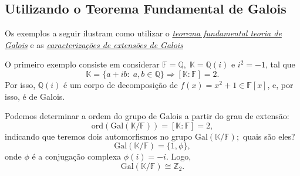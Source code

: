 \documentclass[../algebraIII_notes.tex]{subfiles}
\begin{document}
\subsection{Utilizando o Teorema Fundamental de Galois}
Os exemplos a seguir ilustram como utilizar o \hyperlink{fundamental_galois}{\textit{teorema fundamental teoria de Galois}} e as \hyperlink{galois_characterization}{\textit{caracterizações de extensões de Galois}}
\begin{example}
	O primeiro exemplo consiste em considerar \(\mathbb{F} = \mathbb{Q},\; \mathbb{K} = \mathbb{Q}(i)\) e \(i^{2}=-1\), tal que
	\[
		\mathbb{K} = \{a+ib:\; a, b\in \mathbb{Q}\} \Rightarrow [\mathbb{K}:\mathbb{F}]=2.
	\]
	Por isso, \(\mathbb{Q}(i)\) é um corpo de decomposição de \(f(x)=x^{2}+1\in \mathbb{F}[x]\), e, por isso, é de Galois.

	Podemos determinar a ordem do grupo de Galois a partir do grau de extensão:
	\[
		\mathrm{ord}(\mathrm{Gal}(\mathbb{K}/\mathbb{F}))=[\mathbb{K}:\mathbb{F}]=2,
	\]
	indicando que teremos dois automorfismos no grupo \(\mathrm{Gal}(\mathbb{K}/\mathbb{F});\) quais são eles?
	\[
		\mathrm{Gal}(\mathbb{K}/\mathbb{F}) = \{1, \phi \},
	\]
	onde \(\phi \) é a conjugação complexa \(\phi (i) = -i\). Logo,
	\[
		\mathrm{Gal}(\mathbb{K}/\mathbb{F})\cong \mathbb{Z}_{2}.
	\]
\end{example}
\end{document}
